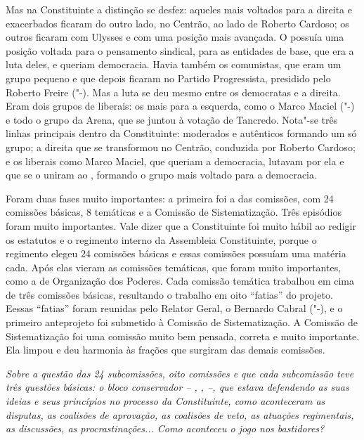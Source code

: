 Mas na Constituinte a distinção se desfez: aqueles mais voltados para a
direita e exacerbados ficaram do outro lado, no Centrão, ao lado de
Roberto Cardoso; os outros ficaram com Ulysses e com uma posição mais
avançada. O  possuía uma posição voltada para o pensamento sindical,
para as entidades de base, que era a luta deles, e queriam democracia.
Havia também os comunistas, que eram um grupo pequeno e que depois
ficaram no Partido Progressista, presidido pelo Roberto Freire ("-).
Mas a luta se deu mesmo entre os democratas e a direita. Eram dois
grupos de liberais: os mais para a esquerda, como o Marco Maciel
("-) e todo o grupo da Arena, que se juntou à votação de Tancredo.
Nota"-se três linhas principais dentro da Constituinte: moderados e
autênticos formando um só grupo; a direita que se transformou no
Centrão, conduzida por Roberto Cardoso; e os liberais como Marco Maciel,
que queriam a democracia, lutavam por ela e que se o uniram ao ,
formando o grupo mais voltado para a democracia.

Foram duas fases muito importantes: a primeira foi a das comissões, com
24 comissões básicas, 8 temáticas e a Comissão de Sistematização. Três
episódios foram muito importantes. Vale dizer que a Constituinte foi
muito hábil ao redigir os estatutos e o regimento interno da Assembleia
Constituinte, porque o regimento elegeu 24 comissões básicas e essas
comissões possuíam uma matéria cada. Após elas vieram as comissões
temáticas, que foram muito importantes, como a de Organização dos
Poderes. Cada comissão temática trabalhou em cima de três comissões
básicas, resultando o trabalho em oito ``fatias'' do projeto. Eessas
``fatias'' foram reunidas pelo Relator Geral, o Bernardo Cabral
("-), e o primeiro anteprojeto foi submetido à Comissão de
Sistematização. A Comissão de Sistematização foi uma comissão muito bem
pensada, correta e muito importante. Ela limpou e deu harmonia às
frações que surgiram das demais comissões.

\emph{Sobre a questão das 24 subcomissões, oito comissões e que cada
subcomissão teve três questões básicas: o bloco conservador -- , ,
 --, que estava defendendo as suas ideias e seus princípios no
processo da Constituinte, como aconteceram as disputas, as coalisões de
aprovação, as coalisões de veto, as atuações regimentais, as discussões,
as procrastinações... Como aconteceu o jogo nos bastidores?}

